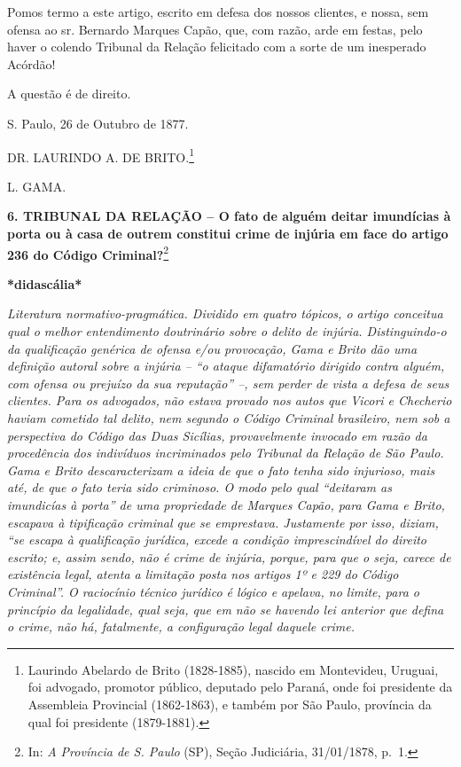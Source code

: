 Pomos termo a este artigo, escrito em defesa dos nossos clientes, e
nossa, sem ofensa ao sr. Bernardo Marques Capão, que, com razão, arde em
festas, pelo haver o colendo Tribunal da Relação felicitado com a sorte
de um inesperado Acórdão!

A questão é de direito.

S. Paulo, 26 de Outubro de 1877.

DR. LAURINDO A. DE BRITO.\footnote{Laurindo Abelardo de Brito
  (1828-1885), nascido em Montevideu, Uruguai, foi advogado, promotor
  público, deputado pelo Paraná, onde foi presidente da Assembleia
  Provincial (1862-1863), e também por São Paulo, província da qual foi
  presidente (1879-1881).}

L. GAMA.

\textbf{6. TRIBUNAL DA RELAÇÃO -- O fato de alguém deitar imundícias à
porta ou à casa de outrem constitui crime de injúria em face do artigo
236 do Código Criminal?}\footnote{In: \emph{A Província de S. Paulo}
  (SP), Seção Judiciária, 31/01/1878, p.~1.}

\textbf{*didascália*}

\emph{Literatura normativo-pragmática. Dividido em quatro tópicos, o
artigo conceitua qual o melhor entendimento doutrinário sobre o delito
de injúria. Distinguindo-o da qualificação genérica de ofensa e/ou
provocação, Gama e Brito dão uma definição autoral sobre a injúria --
``o ataque difamatório dirigido contra alguém, com ofensa ou prejuízo da
sua reputação'' --, sem perder de vista a defesa de seus clientes. Para
os advogados, não estava provado nos autos que Vicori e Checherio haviam
cometido tal delito, nem segundo o Código Criminal brasileiro, nem sob a
perspectiva do Código das Duas Sicílias, provavelmente invocado em razão
da procedência dos indivíduos incriminados pelo Tribunal da Relação de
São Paulo. Gama e Brito descaracterizam a ideia de que o fato tenha sido
injurioso, mais até, de que o fato teria sido criminoso. O modo pelo
qual ``deitaram as imundicías à porta'' de uma propriedade de Marques
Capão, para Gama e Brito, escapava à tipificação criminal que se
emprestava. Justamente por isso, diziam, ``se escapa à qualificação
jurídica, excede a condição imprescindível do direito escrito; e, assim
sendo, não é crime de injúria, porque, para que o seja, carece de
existência legal, atenta a limitação posta nos artigos 1º e 229 do
Código Criminal''. O raciocínio técnico jurídico é lógico e apelava, no
limite, para o princípio da legalidade, qual seja, que em não se havendo
lei anterior que defina o crime, não há, fatalmente, a configuração
legal daquele crime. }

